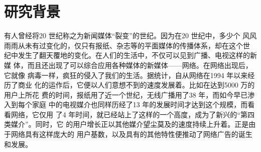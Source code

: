 
\section{研究背景}

有人曾经将20 世纪称之为新闻媒体“裂变”的世纪。因为在20 世纪中，多少个
风风雨雨从未有过变化的，仅只有报纸、杂志等的平面媒体的传播体系，却在这个世
纪中发生了翻天覆地的变化。在人们的生活中，不仅可以见到广播、电视这样的新媒
体，而且还出现了可以综合应用各种媒体的新媒体——网络。在网络出现后，它就像
病毒一样，疯狂的侵入了我们的生活。据统计，自从网络在1994 年以来经历了商业
化的运作后，它便以人们意想不到的速度发展着。比如在达到5000 万的用户上所花
费的时间，报纸用了近一个世纪，无线广播用了38 年，而如今早已渗入到每个家庭
中的电视媒介也同样历经了13 年的发展时间才达到这个规模，而看看网络，它仅用
了4 年时间，就已经站上了这样的一个高度，成为了新兴的“第四类媒介”。同时，它
的用户增长正以其他媒介望尘莫及的速度持续上升着。正是由于网络具有这样庞大的
用户基数，以及具有的其他特性便推动了网络广告的诞生和发展。
